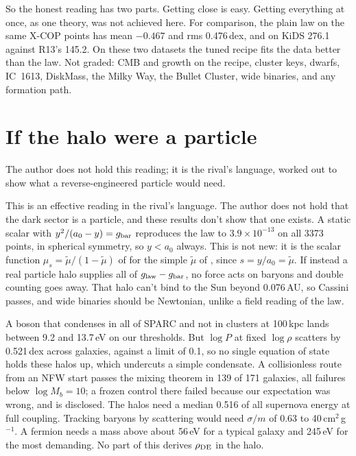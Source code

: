 \documentclass[11pt]{article}
\begin{document}
So the honest reading has two parts. Getting close is easy. Getting everything at once, as one theory, was not achieved here. For comparison, the plain law on the same X-COP points has mean $-0.467$ and rms 0.476\,dex, and on KiDS 276.1 against R13's 145.2. On these two datasets the tuned recipe fits the data better than the law. Not graded: CMB and growth on the recipe, cluster keys, dwarfs, IC~1613, DiskMass, the Milky Way, the Bullet Cluster, wide binaries, and any formation path.

\section{If the halo were a particle}
The author does not hold this reading; it is the rival's language, worked out to show what a reverse-engineered particle would need.

This is an effective reading in the rival's language. The author does not hold that the dark sector is a particle, and these results don't show that one exists. A static scalar with $y^2/(a_0-y)=g_{\rm bar}$ reproduces the law to $3.9\times10^{-13}$ on all 3373 points, in spherical symmetry, so $y<a_0$ always. This is not new: it is the scalar function $\mu_s=\tilde\mu/(1-\tilde\mu)$ of \cite{zhao06} for the simple $\tilde\mu$ of \cite{famaey05}, since $s=y/a_0=\tilde\mu$. If instead a real particle halo supplies all of $g_{\rm law}-g_{\rm bar}$, no force acts on baryons and double counting goes away. That halo can't bind to the Sun beyond 0.076\,AU, so Cassini passes, and wide binaries should be Newtonian, unlike a field reading of the law.

A boson that condenses in all of SPARC and not in clusters at 100\,kpc lands between 9.2 and 13.7\,eV on our thresholds. But $\log P$ at fixed $\log\rho$ scatters by 0.521\,dex across galaxies, against a limit of 0.1, so no single equation of state holds these halos up, which undercuts a simple condensate. A collisionless route from an NFW start passes the mixing theorem in 139 of 171 galaxies, all failures below $\log M_b=10$; a frozen control there failed because our expectation was wrong, and is disclosed. The halos need a median 0.516 of all supernova energy at full coupling. Tracking baryons by scattering would need $\sigma/m$ of 0.63 to 40\,cm$^2$\,g$^{-1}$. A fermion needs a mass above about 56\,eV for a typical galaxy and 245\,eV for the most demanding. No part of this derives $\rho_{\rm DE}$ in the halo.
\end{document}
